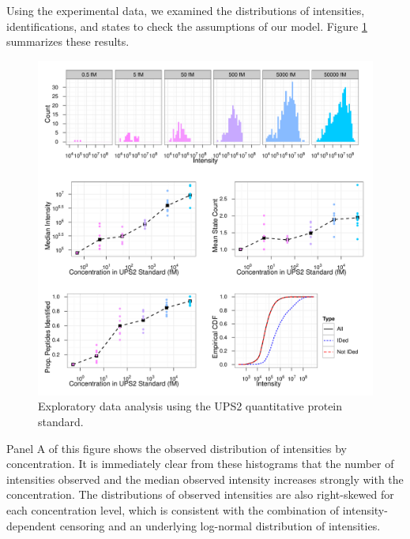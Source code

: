 Using the experimental data, we examined the distributions of intensities, identifications, and states to check the assumptions of our model.
Figure \ref{proteomics:fig:EDA-Figure} summarizes these results.
%
\begin{figure}
\centering
\includegraphics[width=\textwidth]{figures/proteomics/New_EDA_Multipanel_Figure}
\caption{Exploratory data analysis using the UPS2 quantitative protein standard.
\label{proteomics:fig:EDA-Figure}}
\end{figure}
%
Panel A of this figure shows the observed distribution of intensities by concentration.
It is immediately clear from these histograms that the number of intensities observed and the median observed intensity increases strongly with the concentration.
The distributions of observed intensities are also right-skewed for each concentration level, which is consistent with the combination of intensity-dependent censoring and an underlying log-normal distribution of intensities.

